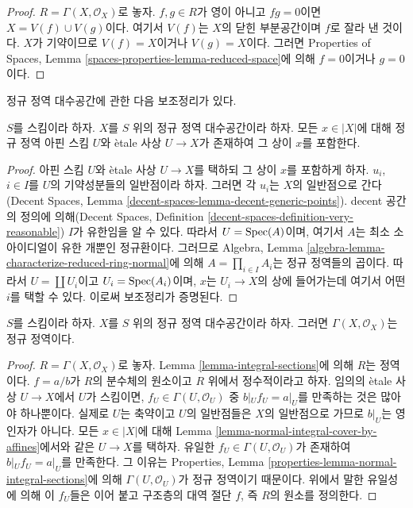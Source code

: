 \begin{proof}
$R = \Gamma(X, \mathcal{O}_X)$로 놓자. $f, g \in R$가 영이 아니고
$fg = 0$이면 $X = V(f) \cup V(g)$이다. 여기서 $V(f)$는 $X$의 닫힌
부분공간이며 $f$로 잘라 낸 것이다. $X$가 기약이므로 $V(f) = X$이거나
$V(g) = X$이다. 그러면 Properties of Spaces, Lemma
\ref{spaces-properties-lemma-reduced-space}에 의해 $f = 0$이거나
$g = 0$이다.
\end{proof}

\noindent
정규 정역 대수공간에 관한 다음 보조정리가 있다.

\begin{lemma}
\label{lemma-normal-integral-cover-by-affines}
$S$를 스킴이라 하자. $X$를 $S$ 위의 정규 정역 대수공간이라 하자.
모든 $x \in |X|$에 대해 정규 정역 아핀 스킴 $U$와 \`etale 사상
$U \to X$가 존재하여 그 상이 $x$를 포함한다.
\end{lemma}

\begin{proof}
아핀 스킴 $U$와 \`etale 사상 $U \to X$를 택하되 그 상이 $x$를
포함하게 하자.
$u_i$, $i \in I$를 $U$의 기약성분들의 일반점이라 하자. 그러면 각
$u_i$는 $X$의 일반점으로 간다(Decent Spaces, Lemma
\ref{decent-spaces-lemma-decent-generic-points}). decent 공간의 정의에
의해(Decent Spaces, Definition
\ref{decent-spaces-definition-very-reasonable}) $I$가 유한임을 알 수 있다.
따라서 $U = \mathop{\mathrm{Spec}}(A)$이며, 여기서 $A$는 최소 소아이디얼이 유한 개뿐인
정규환이다. 그러므로 Algebra, Lemma
\ref{algebra-lemma-characterize-reduced-ring-normal}에 의해
$A = \prod_{i \in I} A_i$는 정규 정역들의 곱이다. 따라서
$U = \coprod U_i$이고 $U_i = \mathop{\mathrm{Spec}}(A_i)$이며, $x$는 $U_i \to X$의
상에 들어가는데 여기서 어떤 $i$를 택할 수 있다. 이로써 보조정리가
증명된다.
\end{proof}

\begin{lemma}
\label{lemma-normal-integral-sections}
$S$를 스킴이라 하자. $X$를 $S$ 위의 정규 정역 대수공간이라 하자.
그러면 $\Gamma(X, \mathcal{O}_X)$는 정규 정역이다.
\end{lemma}

\begin{proof}
$R = \Gamma(X, \mathcal{O}_X)$로 놓자. Lemma
\ref{lemma-integral-sections}에 의해 $R$는 정역이다. $f = a/b$가 $R$의
분수체의 원소이고 $R$ 위에서 정수적이라고 하자. 임의의 \`etale 사상
$U \to X$에서 $U$가 스킴이면, $f_U \in \Gamma(U, \mathcal{O}_U)$ 중
$b|_U f_U = a|_U$를 만족하는 것은 많아야 하나뿐이다. 실제로 $U$는
축약이고 $U$의 일반점들은 $X$의 일반점으로 가므로 $b|_U$는
영인자가 아니다. 모든 $x \in |X|$에 대해 Lemma
\ref{lemma-normal-integral-cover-by-affines}에서와 같은 $U \to X$를
택하자. 유일한 $f_U \in \Gamma(U, \mathcal{O}_U)$가 존재하여
$b|_U f_U = a|_U$를 만족한다. 그 이유는 Properties, Lemma
\ref{properties-lemma-normal-integral-sections}에 의해
$\Gamma(U, \mathcal{O}_U)$가 정규 정역이기 때문이다. 위에서 말한
유일성에 의해 이 $f_U$들은 이어 붙고 구조층의 대역 절단 $f$,
즉 $R$의 원소를 정의한다.
\end{proof}

